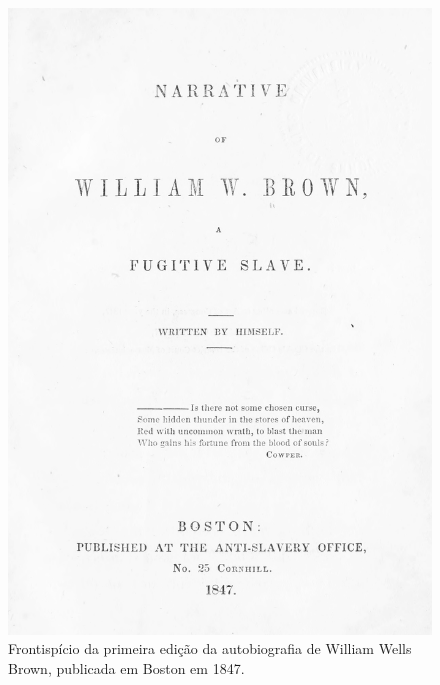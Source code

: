 \pagebreak

\begin{absolutelynopagebreak}
\begin{vplace}
\begin{figure}[H]
\begin{adjustwidth}{-1.65cm}{}
  \vspace*{-2.6cm}
  \includegraphics[width=133mm]{./imgs/front2.jpg}  
\end{adjustwidth}
  \caption{Frontispício da primeira edição da autobiografia de William Wells Brown, publicada em Boston em 1847.}
\end{figure}
\end{vplace}

\thispagestyle{empty}
\end{absolutelynopagebreak}


